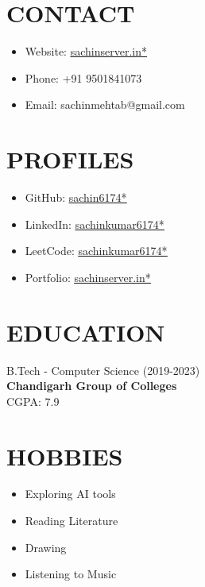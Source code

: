 \documentclass[10pt,a4paper]{moderncv}
\let\oldhref\href
\renewcommand{\href}[2]{\oldhref{#1}{\underline{#2}}}
\begin{document}
\begin{minipage}[t]{0.35\textwidth}
\section{CONTACT}
\begin{itemize}
    \item Website: \href{https://www.sachinserver.in}{sachinserver.in*}
    \item Phone: +91 9501841073
    \item Email: sachinmehtab@gmail.com
\end{itemize}

\section{PROFILES}
\begin{itemize}
    \item GitHub: \href{https://github.com/sachin6174}{sachin6174*}
    \item LinkedIn: \href{https://linkedin.com/in/sachinkumar6174}{sachinkumar6174*}
    \item LeetCode: \href{https://leetcode.com/u/sachinkumar6174/}{sachinkumar6174*}
    \item Portfolio: \href{https://sachinserver.in/}{sachinserver.in*}
\end{itemize}

\section{EDUCATION}
B.Tech - Computer Science (2019-2023) \\
\textbf{Chandigarh Group of Colleges} \\
\faCalendar\enspace CGPA: 7.9

\section{HOBBIES}
\begin{itemize}
    \item Exploring AI tools
    \item Reading Literature
    \item Drawing
    \item Listening to Music
\end{itemize}

\end{minipage}
\end{document}

